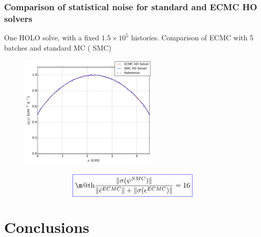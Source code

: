 \documentclass[xcolor=dvipsnames]{beamer}
\makeatletter
\newcommand*{\boxedcolor}{blue}
\renewcommand{\boxed}[1]{\textcolor{\boxedcolor}{%
  \fbox{\normalcolor\m@th$\displaystyle#1$}}}
\newcommand{\colb}[1]{{\color{blue} #1}}
\newcommand{\colr}[1]{{\color{red} #1}}
\makeatother
\begin{document}
\begin{frame}
    \fontsize{9}{5.0}\selectfont
    \frametitle{Comparison of statistical noise for standard and ECMC HO solvers}
    \begin{block}{}
        One HOLO solve, with a fixed $1.5\times10^5$ histories. Comparison of
            \colr{ECMC} with 5 batches and standard MC (\colb{SMC}) 
    \end{block}\pause
  \begin{figure}
    \centering
    \includegraphics[width=0.589\textwidth]{sood_smc_compare.pdf} 
  \end{figure}
  \pause
  \begin{equation*}
  \boxed{
  \displaystyle\frac{\|\sigma(\psi^{SMC})\|}{\|\tilde\epsilon^{ECMC}\|
  +\|\sigma(\epsilon^{ECMC})\| }=16}
  \end{equation*}

\end{frame}

\section{Conclusions}
\subsection{}
\end{document}
